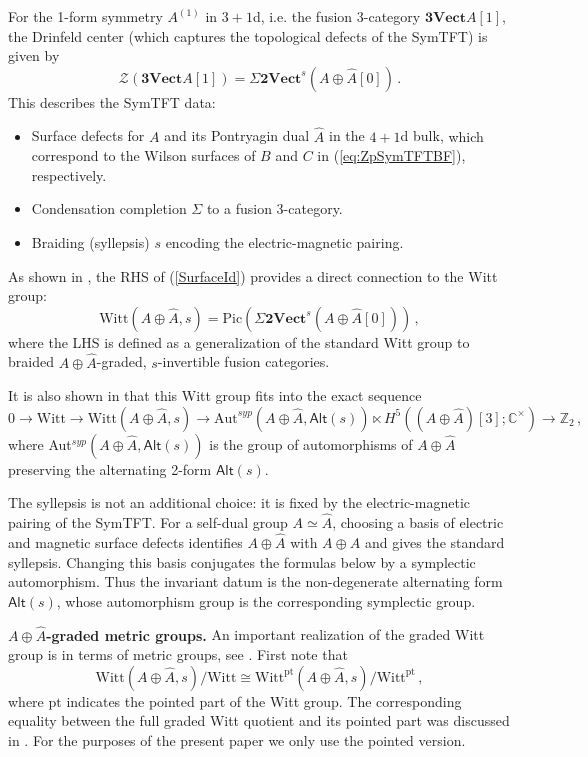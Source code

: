 \documentclass[aps,twocolumn,prx,floatfix,preprintnumbers, nofootinbib,10pt]{revtex4-2}
\numberwithin{equation}{section}
\theoremstyle{definition}
\theoremstyle{remark}
\theoremstyle{claim}
\newcommand{\be}{\begin{equation}}
\newcommand{\ee}{\end{equation}}
\newcommand{\Z}{{\mathbb Z}}
\newcommand{\cZ}{\mathcal{Z}}
\newcommand{\cVect}{\mathbf{3Vect}}
\newcommand{\bVect}{\mathbf{2Vect}}
\newcommand{\Pic}{\text{Pic}}
\newcommand{\Witt}{\text{Witt}}
\newcommand{\pt}{\text{pt}}
\begin{document}
For the 1-form symmetry $A^{(1)}$ in $3+1$d, i.e. the fusion 3-category $\cVect A[1]$, the Drinfeld center (which captures the topological defects of the SymTFT) is given by   
\be\label{SurfaceId}
\cZ (\cVect A[1]) = \Sigma \bVect^s (A \oplus \widehat{A} [0] )\,.
\ee
This describes the SymTFT data: 
\begin{itemize}
\item  Surface defects for $A$ and its Pontryagin dual $\widehat{A}$ in the $4+1$d bulk, {which correspond to the Wilson surfaces of $B$ and $C$ in (\ref{eq:ZpSymTFTBF}), respectively.}
\item  Condensation completion $\Sigma$ to a fusion 3-category.
\item  Braiding (syllepsis) $s$ encoding the electric-magnetic pairing.
\end{itemize}
As shown in \cite{Bhardwaj:2024xcx}, the RHS of (\ref{SurfaceId}) provides a direct connection to the Witt group:
\be
\label{WittPic}
\Witt (A \oplus \widehat{A}, s) = \Pic ({\Sigma}\bVect^s (A \oplus \widehat{A}[0]))\,,
\ee
where the LHS is defined as a generalization of the standard Witt group to braided $A \oplus \widehat{A}$-graded, $s$-invertible fusion categories.

\begin{widetext}
{It is also shown in \cite{Bhardwaj:2024xcx}} that this Witt group fits into the exact sequence
\be \label{ShortishSequence}
0\rightarrow \Witt\rightarrow \Witt(A\oplus \widehat{A},s)\rightarrow \text{Aut}^{syp}(A\oplus \widehat{A},\mathsf{Alt}(s))\ltimes H^5((A\oplus \widehat{A})[3];\mathbb{C}^{\times})\rightarrow \Z_2\,,
\ee 
where Aut$^{syp}(A\oplus \widehat{A},\mathsf{Alt}(s))$ is the group of automorphisms of $A\oplus \widehat{A}$ preserving the alternating 2-form $\mathsf{Alt}(s)$.
\end{widetext}

The syllepsis is not an additional choice: it is fixed by the
electric-magnetic pairing of the SymTFT.  For a self-dual group
$A\simeq\widehat{A}$, choosing a basis of electric and magnetic surface defects
identifies $A\oplus\widehat{A}$ with $A\oplus A$ and gives the standard 
syllepsis. Changing this basis conjugates the formulas below by a symplectic
automorphism.  Thus the invariant datum is the non-degenerate alternating form
$\mathsf{Alt}(s)$, whose automorphism group is the corresponding symplectic
group.



\smallskip
\noindent
{\bf ${A \oplus \widehat{A}}$-graded metric groups.}
An important realization of the graded Witt group is in terms of metric groups, see  \cite{Bhardwaj:2024xcx}. First note that 
\be
\Witt ({A \oplus \widehat{A}}, s)/\Witt\cong  
\Witt^{\pt} ({A \oplus \widehat{A}},s)/\Witt^{\pt} \,,
\ee
where $\pt$ indicates the pointed part of the Witt group. 
 The corresponding equality between the full graded
Witt quotient and its pointed part was discussed in \cite{Bhardwaj:2024xcx}. For the purposes of the present paper we only use the pointed version.
\end{document}
